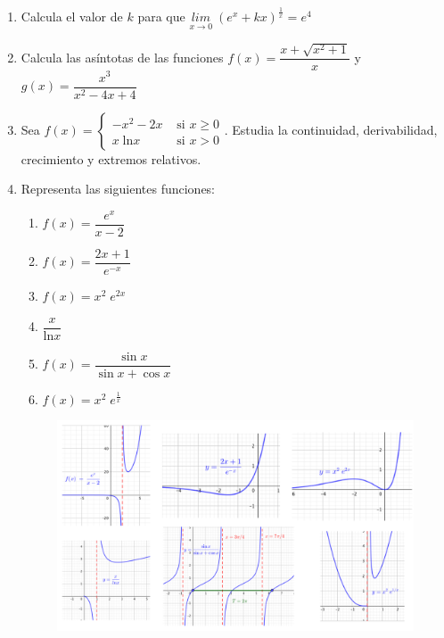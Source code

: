 \begin{enumerate}
\rightline{\textcolor{gris}{Soluciones: $a)\; +\infty;\quad b)\; 0;\quad c)\; 0; \quad d)\; 1; \quad e)\; 0$}}
\rightline{\textcolor{gris}{$ f)\; 9/2; \quad g)\; -1/2; \quad h)\; 1 \quad i)\; 1; \quad j)\;  1$}}


\item Calcula el valor de $k$ para que  $\underset{x\to 0}{lim}\;{(e^x+kx)^\frac 1 x}=e^4$ 

\rightline{\textcolor{gris}{Solución: $k=3$}}

\item Calcula las asíntotas de las funciones $f(x)=\dfrac {x+\sqrt{x^2+1}}{x}$ y $g(x)=\dfrac {x^3}{x^2-4x+4}$

\rightline{\textcolor{gris}{Soluciónes: $f(x):\quad x=0:\; AV;	\quad y=1:\;  AH (+\infty); \quad y=0:\; AH (-\infty)$}}
\rightline{\textcolor{gris}{ $g(x):\quad x=2:\; AV; \quad y=x+3:\; AO$}}
 \item Sea $f(x)=\begin{cases}
	-x^2-2x & \mbox{ si } x\ge 0 \\
	x\; \mathrm{ln}x & \mbox{ si } x>0
	\end{cases}$. Estudia la continuidad, derivabilidad, crecimiento y extremos relativos.
	

\item Representa las siguientes funciones:
	\begin{multicols}{2}
	\begin{enumerate}
	\item $f(x)=\dfrac {e^x}{x-2}$
	\item $f(x)=\dfrac {2x+1}{e^{-x}}$
	\item $f(x)=x^2\; e^{2x}$
	\item $\dfrac {x}{\mathrm{ln}x}$
	\item $f(x)=\dfrac {\sin x}{\sin x + \cos x}$
	\item $f(x)=x^2 \; e^{\frac 1 x}$
	\end{enumerate}	
	\end{multicols}

\rightline{\textcolor{gris}{Solución: Imagen adjunta}}
	\begin{figure}[H]
		\centering
		\includegraphics[width=1\textwidth]{imagenes/imagenes05/T05IM54.png}
	\end{figure}
\end{enumerate}




	
	

	
		
